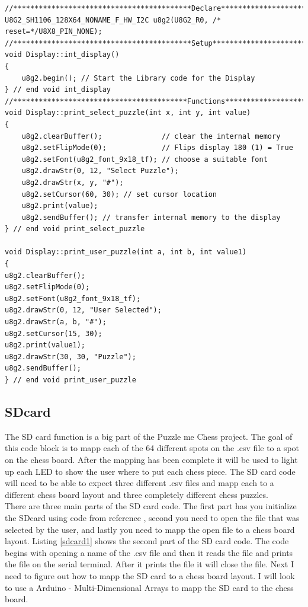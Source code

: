 \documentclass[11pt]{article}
\begin{document}
\newpage

\begin{lstlisting}[caption={Puzzle me Chess - display.cpp file},label={Display}]
//******************************************Declare**********************//
U8G2_SH1106_128X64_NONAME_F_HW_I2C u8g2(U8G2_R0, /* reset=*/U8X8_PIN_NONE);
//******************************************Setup***********************//
void Display::int_display()
{
    u8g2.begin(); // Start the Library code for the Display
} // end void int_display
//*****************************************Functions********************//
void Display::print_select_puzzle(int x, int y, int value)
{   
    u8g2.clearBuffer();              // clear the internal memory
    u8g2.setFlipMode(0);             // Flips display 180 (1) = True
    u8g2.setFont(u8g2_font_9x18_tf); // choose a suitable font
    u8g2.drawStr(0, 12, "Select Puzzle");
    u8g2.drawStr(x, y, "#");
    u8g2.setCursor(60, 30); // set cursor location
    u8g2.print(value);
    u8g2.sendBuffer(); // transfer internal memory to the display
} // end void print_select_puzzle

void Display::print_user_puzzle(int a, int b, int value1)
{
u8g2.clearBuffer();
u8g2.setFlipMode(0);
u8g2.setFont(u8g2_font_9x18_tf); 
u8g2.drawStr(0, 12, "User Selected");
u8g2.drawStr(a, b, "#");
u8g2.setCursor(15, 30); 
u8g2.print(value1);
u8g2.drawStr(30, 30, "Puzzle");
u8g2.sendBuffer();
} // end void print_user_puzzle
\end{lstlisting}

\subsection{SDcard}
The SD card function is a big part of the Puzzle me Chess project. The goal of this code block is to mapp each of the 64 different spots on the .csv file to a spot on the chess board. After the mapping has been complete it will be used to light up each LED to show the user where to put each chess piece. The SD card code will need to be able to expect three different .csv files and mapp each to a different chess board layout and three completely different chess puzzles. 
\\

\noindent There are three main parts of the SD card code. The first part has you initialize the SDcard using code from reference \cite{sdcard}, second you need to open the file that was selected by the user, and lastly you need to mapp the open file to a chess board layout. Listing \ref{sdcard1} shows the second part of the SD card code. The code begins with opening a name of the .csv file and then it reads the file and prints the file on the serial terminal. After it prints the file it will close the file. Next I need to figure out how to mapp the SD card to a chess board layout. I will look to use a Arduino - Multi-Dimensional Arrays to mapp the SD card to the chess board. 
\end{document}
